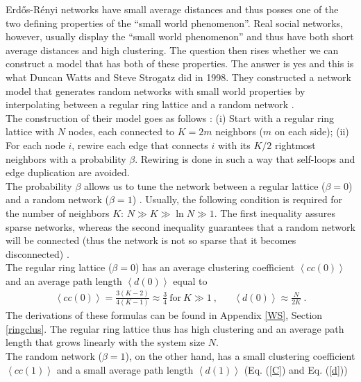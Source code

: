 \documentclass[11 pt , letterpaper , twoside , openright]{book}
\begin{document}
Erd\H{o}s-R\'{e}nyi networks have small average distances and thus posses one of the two defining properties of the ``small world phenomenon''. Real social networks, however, usually display the ``small world phenomenon'' and thus have both short average distances and high clustering. The question then rises whether we can construct a model that has both of these properties. The answer is yes and this is what Duncan Watts and Steve Strogatz did in 1998. They constructed a network model that generates random networks with small world properties by interpolating between a regular ring lattice and a random network \cite{Watts1998}.\\
\newline
The construction of their model goes as follows \cite{Watts1998}: (i) Start with a regular ring lattice with $N$ nodes, each connected to $K = 2m$ neighbors ($m$ on each side); (ii) For each node $i$, rewire each edge that connects $i$ with its $K/2$ rightmost neighbors with a probability $\beta$. Rewiring is done in such a way that self-loops and edge duplication are avoided.\\
\newline
The probability $\beta$ allows us to tune the network between a regular lattice ($\beta = 0$) and a random network ($\beta = 1$) \cite{Watts1998}. Usually, the following condition is required for the number of neighbors $K$: $N \gg K \gg \ln{N} \gg 1$. The first inequality assures sparse networks, whereas the second inequality guarantees that a random network will be connected (thus the network is not so sparse that it becomes disconnected) \cite{Watts1998}.\\
\newline
The regular ring lattice ($\beta=0$) has an average clustering coefficient $\left<cc(0)\right>$ and an average path length $\left<d(0)\right>$ equal to \cite{Watts1998}
\begin{align}\label{C0}
	\left<cc(0)\right> = \frac{3(K-2)}{4(K-1)} \approx \frac{3}{4} \ \text{for}\ K \gg 1 \ , && \left<d(0)\right> \approx \frac{N}{2K} \ .
\end{align}
The derivations of these formulas can be found in Appendix \ref{WS}, Section \ref{ringclus}. The regular ring lattice thus has high clustering and an average path length that grows linearly with the system size $N$. \\
\newline
The random network ($\beta = 1$), on the other hand, has a small clustering coefficient $\left<cc(1)\right>$ and a small average path length $\left<d(1)\right>$ (Eq. (\ref{C}) and Eq. (\ref{d})) \cite{Watts1998}
\end{document}

